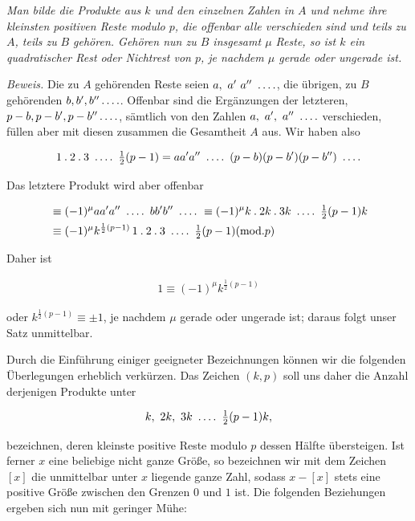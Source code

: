 \emph{Man bilde die Produkte aus $k$ und den einzelnen Zahlen in $A$ und nehme ihre kleinsten positiven Reste modulo $p$, die offenbar alle verschieden sind und teils zu $A$, teils zu} \emph{$B$ gehören. Gehören nun zu $B$ insgesamt $\mu$ Reste, so ist $k$ ein quadratischer Rest oder Nichtrest von $p$, je nachdem $\mu$ gerade oder ungerade ist.}

\emph{Beweis.} Die zu $A$ gehörenden Reste seien $a,\ a'\ a''\ \dotsfour$, die übrigen, zu $B$ gehörenden $b,b',b''\mathinner{.\,.\,.\,.}$. Offenbar sind die Ergänzungen der letzteren, $p-b,p-b',p-b''\mathinner{.\,.\,.\,.}$, sämtlich von den Zahlen $a,\ a',\ a''\ \mathinner{.\,.\,.\,.}$ verschieden, füllen aber mit diesen zusammen die Gesamtheit $A$ aus. Wir haben also

\[
\begin{aligned}
1\pdot2\pdot3\ \dotsfour\ \tfrac12(p-1)=aa' a''\ \dotsfour\ (p-b)(p-b')(p-b'')\ \dotsfour
\end{aligned}
\]

Das letztere Produkt wird aber offenbar

\[
\begin{aligned}
&\equiv(-1)^\mu aa' a''\ \dotsfour\ bb' b''\ \dotsfour\ \equiv(-1)^\mu k\pdot2k\pdot3k\ \dotsfour\ \tfrac12(p-1)k\\
&\equiv(-1)^\mu k^{\frac12(p-1)}\,1\pdot2\pdot3\ \dotsfour\ \tfrac12(p-1) (\mathrm{mod.}p)
\end{aligned}
\]

Daher ist

\[
\begin{aligned}
1\equiv(-1)^\mu k^{\frac12(p-1)}
\end{aligned}
\]

oder $k^{\frac12(p-1)}\equiv\pm1$, je nachdem $\mu$ gerade oder ungerade ist; daraus folgt unser Satz unmittelbar.


Durch die Einführung einiger geeigneter Bezeichnungen können wir die folgenden Überlegungen erheblich verkürzen. Das Zeichen $(k,p)$ soll uns daher die Anzahl derjenigen Produkte unter

\[
\begin{aligned}
k,\ 2k,\ 3k\ \mathinner{.\,.\,.\,.}\ \tfrac12(p-1)k,
\end{aligned}
\]

bezeichnen, deren kleinste positive Reste modulo $p$ dessen Hälfte übersteigen. Ist ferner $x$ eine beliebige nicht ganze Größe, so bezeichnen wir mit dem Zeichen $[x]$ die unmittelbar unter $x$ liegende ganze Zahl, sodass $x-[x]$ stets eine positive Größe zwischen den Grenzen $0$ und $1$ ist. Die folgenden Beziehungen ergeben sich nun mit geringer Mühe:

